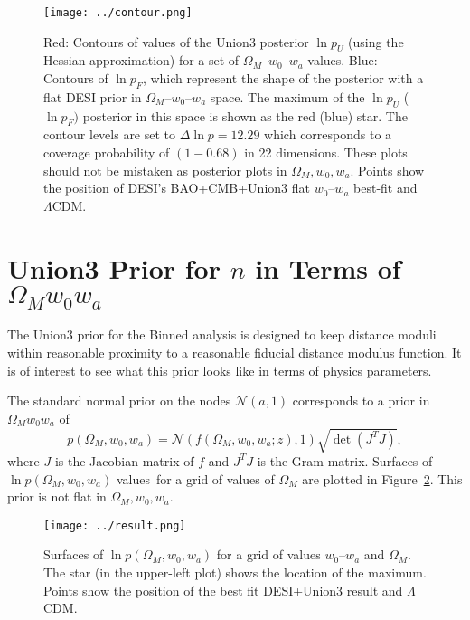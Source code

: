 \documentclass[11pt,a4paper]{article}
\begin{document}
\begin{figure}[htbp] %
   \centering
   \texttt{[image: ../contour.png]} 
   \caption{Red: Contours of values of the Union3 posterior $\ln{p}_U$ (using the Hessian approximation) for a
set of $\Omega_M$--$w_0$--$w_a$ values.
   Blue: Contours of  $\ln{p_F}$, which represent the shape of the posterior with a flat DESI prior in  $\Omega_M$--$w_0$--$w_a$ space.   
   The maximum of the $\ln{p}_U$  ($\ln{p}_F)$ posterior in this space is shown as the red (blue) star.
   The contour levels are set to $\Delta \ln{p}=12.29$ which corresponds
to a coverage probability of $(1-0.68)$ in 22 dimensions. 
   These plots should not be mistaken as posterior plots in  $\Omega_M, w_0, w_a$. 
   Points show the position of DESI's  BAO+CMB+Union3 flat $w_0$--$w_a$ best-fit 
    and  $\Lambda$CDM.}
   \label{fig:posterior}
\end{figure}

\section{Union3 Prior for $n$ in Terms of $\Omega_Mw_0w_a$}
The Union3 prior for the Binned analysis is designed to keep distance moduli within reasonable proximity to a reasonable
fiducial distance modulus function.  It is of interest to see what this prior looks like in terms of physics parameters.

The standard normal prior on the nodes $\mathcal{N}(a,1)$ corresponds to a prior in  $\Omega_Mw_0w_a$ of
\begin{equation}
p(\Omega_M, w_0,w_a) = \mathcal{N}(f(\Omega_M, w_0, w_a; z),1)  \sqrt{\det{\left(J^T J\right)}},
\end{equation}
where $J$ is the Jacobian matrix of $f$ and $J^TJ$ is the Gram matrix.
Surfaces of $\ln{p}(\Omega_M, w_0,w_a)$ values\ for a grid of values of $\Omega_M$
are plotted in Figure~\ref{fig:priors}.  This prior is not flat in  $\Omega_M, w_0, w_a$.

\begin{figure}[htbp] %
   \centering
   \texttt{[image: ../result.png]} 
   \caption{Surfaces of $\ln{p}(\Omega_M, w_0,w_a)$  for a grid of values
 $w_0$--$w_a$ and $\Omega_M$.    The star (in the upper-left plot) shows the location of the maximum.
   Points show the position of the best fit  DESI+Union3
   result and  $\Lambda$CDM.}
   \label{fig:priors}
\end{figure}
\end{document}
